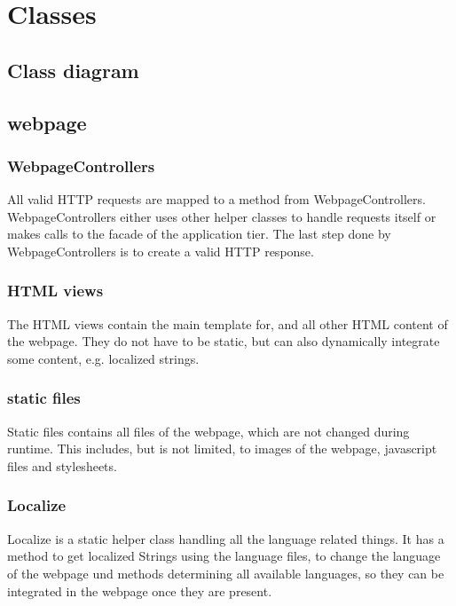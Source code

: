 \section{Classes}

\subsection{Class diagram}

\subsection{webpage} %

\subsubsection*{WebpageControllers}
All valid HTTP requests are mapped to a method from WebpageControllers.
WebpageControllers either uses other helper classes to handle requests itself  
or makes calls to the facade of the application tier. 
The last step done by WebpageControllers is to create a valid HTTP response. %
                                                                              

\subsubsection*{HTML views}
The HTML views contain the main template for, and all other HTML content of the webpage. %
They do not have to be static, but can also dynamically integrate some content, e.g. localized strings.

\subsubsection*{static files}
Static files contains all files of the webpage, which are not changed during runtime. 
This includes, but is not limited, to images of the webpage, javascript files and stylesheets.

\subsubsection*{Localize}
Localize is a static helper class handling all the language related things. 
It has a method to get localized Strings using the language files, 
to change the language of the webpage und methods determining all available languages, %
so they can be integrated in the webpage once they are present.


